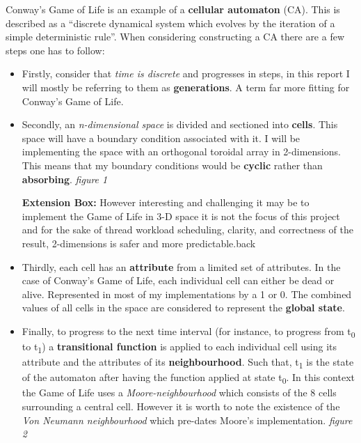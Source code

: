 \documentclass[11pt]{article} %
\begin{document}
Conway's Game of Life is an example of a {\bf cellular automaton} (CA). This is described \cite[Lesser, Wuensche, 1992 p6]{ref6} as a ``discrete dynamical system which evolves by the iteration of a simple deterministic rule''. When considering constructing a CA there are a few steps one has to follow:
\begin{itemize}
\item Firstly, consider that \emph{time is discrete} and progresses in steps, in this report I will mostly be referring to them as {\bf generations}. A term far more fitting for Conway's Game of Life. 
\item Secondly, an \emph{n-dimensional space} is divided and sectioned into {\bf cells}. This space will have a boundary condition associated with it. I will be implementing the space with an orthogonal toroidal array in 2-dimensions. This means that my boundary conditions would be {\bf cyclic} rather than {\bf absorbing}. {\it figure 1}
\begin{mdframed}
{\bf Extension Box:} However interesting and challenging it may be to implement the Game of Life in 3-D space it is not the focus of this project and for the sake of thread workload scheduling, clarity, and correctness of the result, 2-dimensions is safer and more predictable.back
\end{mdframed}
\item Thirdly, each cell has an {\bf attribute} from a limited set of attributes. In the case of Conway's Game of Life, each individual cell can either be dead or alive. Represented in most of my implementations by a 1 or 0. The combined values of all cells in the space are considered to represent the {\bf global state}.
\item Finally, to progress to the next time interval (for instance, to progress from t\textsubscript{0} to t\textsubscript{1}) a {\bf transitional function} is applied to each individual cell using its attribute and the attributes of its {\bf neighbourhood}. Such that, t\textsubscript{1} is the state of the automaton after having the function applied at state t\textsubscript{0}. In this context the Game of Life uses a \emph{Moore-neighbourhood} which consists of the 8 cells surrounding a central cell. However it is worth to note the existence of the \emph{Von Neumann neighbourhood} which pre-dates Moore's implementation. {\it figure 2}
\end{itemize}
\end{document}
